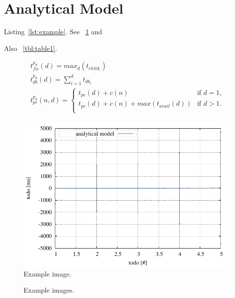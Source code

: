 \section{Analytical Model}\label{sec:analyze}

Listing~\ref{lst:example}.
See \figurename~\ref{fig:example1} and

Also \tablename~\ref{tbl:table1}.

\lstset{language=Java, caption=Example Code, label=lst:example}


\small
\begin{equation}
  \begin{array}{l}
    \displaystyle t^{p_d}_{fw}(d) = max_{d}(t_{child_{i}}) \\
    \displaystyle t^{p_d}_{db}(d) = \sum_{i=1}^{d} t_{db_{i}} \\
    \displaystyle t^{p_d}_{pc}(n,d) =
    	\begin{cases}
        	t_{pc}(d) + c(n) & \text{if $d = 1$,}\\
        	t_{pc}(d) + c(n) + max(t_{avail}(d)) & \text{if $d>1$.}\\
        \end{cases}
  \end{array}
  \label{eq:var_idb}
\end{equation}
\normalsize

\begin{figure}
    \centering
    \includegraphics[width=.45\textwidth]{resources/images/example1.pdf} 
    \caption{Example image.}
    \label{fig:example1}
\end{figure}

\begin{figure}
    \centering
    \caption{Example images.}
    \label{fig:exammple2_3}
\end{figure}

